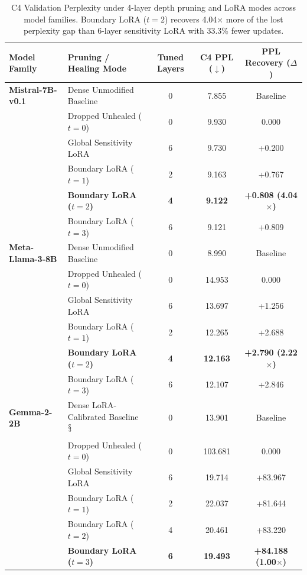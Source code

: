 \documentclass[pmlr,onecolumn]{jmlr}
\begin{document}
\begin{table}[t!]
\centering
\small
\setlength{\tabcolsep}{4pt}
\caption{C4 Validation Perplexity under 4-layer depth pruning and LoRA modes across model families. Boundary LoRA ($t=2$) recovers 4.04$\times$ more of the lost perplexity gap than 6-layer sensitivity LoRA with 33.3\% fewer updates.}
\label{tab:ppl_main}
\footnotesize
\begin{tabular}{l>{\raggedright\arraybackslash}p{3.6cm}ccc}
\toprule
\textbf{Model Family} & \textbf{Pruning / Healing Mode} & \textbf{Tuned Layers} & \textbf{C4 PPL ($\downarrow$)} & \textbf{PPL Recovery ($\Delta$)} \\
\midrule
\textbf{Mistral-7B-v0.1} & Dense Unmodified Baseline & 0 & 7.855 & Baseline \\
& Dropped Unhealed ($t=0$) & 0 & 9.930 & 0.000 \\
& Global Sensitivity LoRA & 6 & 9.730 & +0.200 \\
& Boundary LoRA ($t=1$) & 2 & 9.163 & +0.767 \\
& \textbf{Boundary LoRA ($t=2$)} & \textbf{4} & \textbf{9.122} & \textbf{+0.808 (4.04$\times$)} \\
& Boundary LoRA ($t=3$) & 6 & 9.121 & +0.809 \\
\midrule
\textbf{Meta-Llama-3-8B} & Dense Unmodified Baseline & 0 & 8.990 & Baseline \\
& Dropped Unhealed ($t=0$) & 0 & 14.953 & 0.000 \\
& Global Sensitivity LoRA & 6 & 13.697 & +1.256 \\
& Boundary LoRA ($t=1$) & 2 & 12.265 & +2.688 \\
& \textbf{Boundary LoRA ($t=2$)} & \textbf{4} & \textbf{12.163} & \textbf{+2.790 (2.22$\times$)} \\
& Boundary LoRA ($t=3$) & 6 & 12.107 & +2.846 \\
\midrule
\textbf{Gemma-2-2B} & Dense LoRA-Calibrated Baseline\textsuperscript{$\mathsection$} & 0 & 13.901 & Baseline \\
& Dropped Unhealed ($t=0$) & 0 & 103.681 & 0.000 \\
& Global Sensitivity LoRA & 6 & 19.714 & +83.967 \\
& Boundary LoRA ($t=1$) & 2 & 22.037 & +81.644 \\
& Boundary LoRA ($t=2$) & 4 & 20.461 & +83.220 \\
& \textbf{Boundary LoRA ($t=3$)} & \textbf{6} & \textbf{19.493} & \textbf{+84.188 (1.00$\times$)} \\
\bottomrule
\end{tabular}
\end{table}
\end{document}
